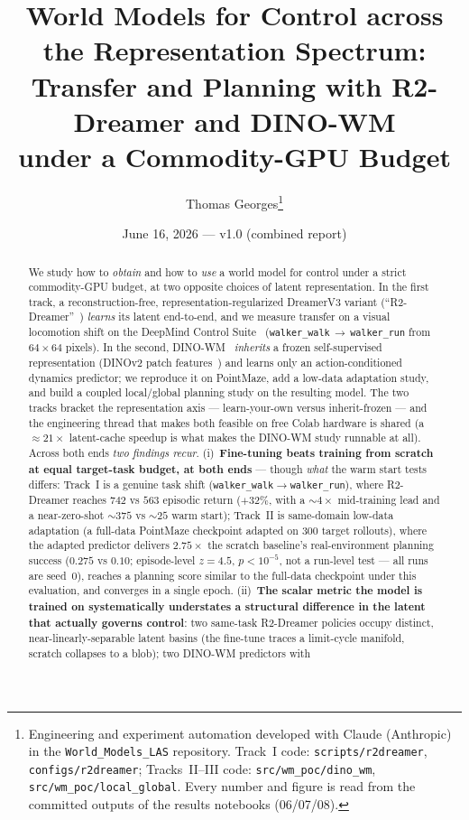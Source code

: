 \documentclass[11pt,a4paper]{article}
\title{World Models for Control across the Representation Spectrum:\\
Transfer and Planning with R2-Dreamer and DINO-WM\\
under a Commodity-GPU Budget}
\author{Thomas Georges\thanks{Engineering and experiment automation developed with
Claude (Anthropic) in the \texttt{World\_Models\_LAS} repository. Track~I code:
\texttt{scripts/r2dreamer}, \texttt{configs/r2dreamer}; Tracks~II--III code:
\texttt{src/wm\_poc/dino\_wm}, \texttt{src/wm\_poc/local\_global}. Every number
and figure is read from the committed outputs of the results notebooks
(06/07/08).}}
\date{June 16, 2026 --- v1.0 (combined report)}
\begin{document}
\maketitle

\begin{abstract}
We study how to \emph{obtain} and how to \emph{use} a world model for control
under a strict commodity-GPU budget, at two opposite choices of latent
representation. In the first track, a reconstruction-free,
representation-regularized DreamerV3 variant (``R2-Dreamer''~\cite{r2dreamer,dreamerv3})
\emph{learns} its latent end-to-end, and we measure transfer on a visual
locomotion shift on the DeepMind Control Suite~\cite{dmc}
(\texttt{walker\_walk}\,$\rightarrow$\,\texttt{walker\_run} from $64{\times}64$
pixels). In the second, DINO-WM~\cite{dinowm2025} \emph{inherits} a frozen
self-supervised representation (DINOv2 patch features~\cite{dinov2}) and learns
only an action-conditioned dynamics predictor; we reproduce it on PointMaze,
add a low-data adaptation study, and build a coupled local/global planning study
on the resulting model. The two tracks bracket the representation axis ---
learn-your-own versus inherit-frozen --- and the engineering thread that makes
both feasible on free Colab hardware is shared (a $\approx\!21\times$
latent-cache speedup is what makes the DINO-WM study runnable at all). Across
both ends \emph{two findings recur}. (i)~\textbf{Fine-tuning beats training from
scratch at equal target-task budget, at both ends} --- though \emph{what} the
warm start tests differs: Track~I is a genuine task shift
(\texttt{walker\_walk}$\rightarrow$\texttt{walker\_run}), where R2-Dreamer
reaches $742$ vs $563$ episodic return ($+32\%$, with a ${\sim}4\times$
mid-training lead and a near-zero-shot $\sim\!375$ vs $\sim\!25$ warm start);
Track~II is same-domain low-data adaptation (a full-data PointMaze checkpoint
adapted on $300$ target rollouts), where the adapted predictor delivers
$2.75\times$ the scratch baseline's real-environment planning success ($0.275$ vs
$0.10$; episode-level $z{=}4.5$, $p<10^{-5}$, not a run-level test --- all runs
are seed~0), reaches a planning score similar to the full-data checkpoint under
this evaluation, and converges in a single epoch. (ii)~\textbf{The scalar metric the model is
trained on systematically understates a structural difference in the latent
that actually governs control}: two same-task R2-Dreamer policies occupy
distinct, near-linearly-separable latent basins (the fine-tune traces a
limit-cycle manifold, scratch collapses to a blob); two DINO-WM predictors with

\end{abstract}
\end{document}
